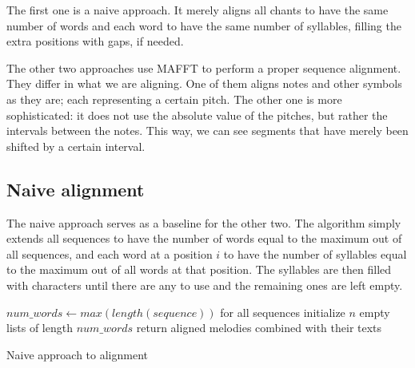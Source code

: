 The first one is a naive approach. It merely aligns all chants to have the same number of words and each word to have the same number of syllables, filling the extra
positions with gaps, if needed.

The other two approaches use MAFFT to perform a proper sequence alignment. They differ in what we are aligning. One of them aligns notes and other symbols as they are;
each representing a certain pitch. The other one is more sophisticated: it does not use the absolute value of the pitches, but rather the intervals between the notes.
This way, we can see segments that have merely been shifted by a certain interval.

\subsection{Naive alignment}

The naive approach serves as a baseline for the other two. The algorithm simply extends all sequences to have the number of words equal to the maximum out of all
sequences, and each word at a position $i$ to have the number of syllables equal to the maximum out of all words at that position. The syllables are then filled
with characters until there are any to use and the remaining ones are left empty.\newline

\begin{algorithm}[H]
    \BlankLine
    $num\_words \longleftarrow max(length(sequence))$ for all sequences\;
    initialize $n$ empty lists of length $num\_words$\;
    return aligned melodies combined with their texts\;
    \caption{Naive approach to alignment}
    \label{algo:align_naive}
\end{algorithm}


